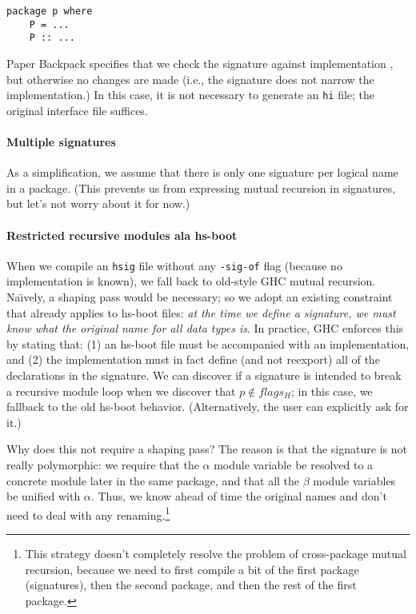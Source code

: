 \documentclass{article}
\begin{document}
\begin{verbatim}
package p where
    P = ...
    P :: ...
\end{verbatim}

Paper Backpack specifies that we check the signature  against implementation
, but otherwise no changes are made (i.e., the signature does not narrow
the implementation.) In this case, it is not necessary to generate an \texttt{hi} file;
the original interface file suffices.

\paragraph{Multiple signatures}  As a simplification, we assume that there
is only one signature per logical name in a package.  (This prevents
us from expressing mutual recursion in signatures, but let's not worry
about it for now.)

\paragraph{Restricted recursive modules ala hs-boot}\label{sec:hs-boot-restrict}
When we compile an \texttt{hsig} file without any \texttt{-sig-of} flag (because
no implementation is known), we fall back to old-style GHC mutual recursion.
Na\"\i vely, a shaping pass would be necessary;
so we adopt an existing constraint that
already applies to hs-boot files: \emph{at the time we define a signature,
we must know what the original name for all data types is}.  In practice,
GHC enforces this by stating that: (1) an hs-boot file must be
accompanied with an implementation, and (2) the implementation must
in fact define (and not reexport) all of the declarations in the signature.
We can discover if a signature is intended to break a recursive module loop
when we discover that $p\notin flags_H$; in this case, we fallback to the
old hs-boot behavior. (Alternatively, the user can explicitly ask for it.)

Why does this not require a shaping pass? The reason is that the
signature is not really polymorphic: we require that the $\alpha$ module
variable be resolved to a concrete module later in the same package, and
that all the $\beta$ module variables be unified with $\alpha$. Thus, we
know ahead of time the original names and don't need to deal with any
renaming.\footnote{This strategy doesn't completely resolve the problem
of cross-package mutual recursion, because we need to first compile a
bit of the first package (signatures), then the second package, and then
the rest of the first package.}
\end{document}
